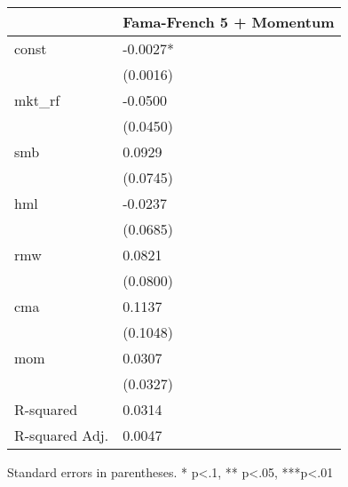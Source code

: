 \begin{table}
\caption{}
\label{}
\begin{center}
\begin{tabular}{ll}
\hline
               & Fama-French 5 + Momentum  \\
\hline
const          & -0.0027*                  \\
               & (0.0016)                  \\
mkt\_rf        & -0.0500                   \\
               & (0.0450)                  \\
smb            & 0.0929                    \\
               & (0.0745)                  \\
hml            & -0.0237                   \\
               & (0.0685)                  \\
rmw            & 0.0821                    \\
               & (0.0800)                  \\
cma            & 0.1137                    \\
               & (0.1048)                  \\
mom            & 0.0307                    \\
               & (0.0327)                  \\
R-squared      & 0.0314                    \\
R-squared Adj. & 0.0047                    \\
\hline
\end{tabular}
\end{center}
\end{table}
\bigskip
Standard errors in parentheses. \newline 
* p<.1, ** p<.05, ***p<.01